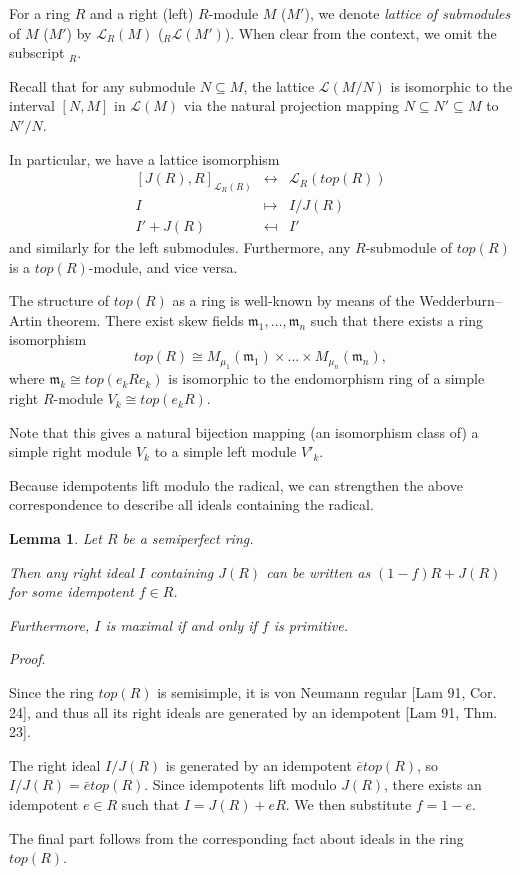 \documentclass[11pt]{article}
\theoremstyle{plain}
\newtheorem{Lemma}[veta]{Lemma}
\theoremstyle{remark}
\theoremstyle{plain}
\newenvironment{Proof}{
  \par\medskip\noindent
  \textit{Proof}.
}{
\newline
\rightline{$\qedsymbol$}
}
\newcommand{\m}{\mathfrak{m}}
\begin{document}
\smallskip 


For a ring $R$ and a right (left) $R$-module $M$ ($M'$), we denote \textit{lattice of submodules} of $M$ ($M'$) by $\mathcal{L}_R(M)$ ($_R\mathcal{L}(M')$). When clear from the context, we omit the subscript $_R$. 

Recall that for any submodule $N\subseteq M$, the lattice $\mathcal{L}(M/N)$ is isomorphic to the interval $[N,M]$ in ${\mathcal{L}(M)}$ via the natural projection  mapping $N\subseteq N'\subseteq M$ to $N'/N$.

In particular, we have a lattice isomorphism \[
\begin{array}{rcl}
    [J(R), R]_{\mathcal{L}_R(R)} & \longleftrightarrow & \mathcal{L}_R(top(R)) \\[1ex]
    I & \longmapsto & I/J(R) \\[1ex]
    I'+J(R) & \mapsfrom & I'
\end{array}
\]
and similarly for the left submodules. Furthermore, any $R$-submodule of $top(R)$ is a $top(R)$-module, and vice versa. 

The structure of $top(R)$ as a ring is well-known by means of the Wedderburn–Artin theorem. There exist skew fields $\m_1, \dots, \m_n$ such that there exists a ring isomorphism \[top(R)\cong M_{\mu_1}(\m_1)\times \dots \times  M_{\mu_n}(\m_n), \]
where $\m_k\cong top(e_kRe_k)$ is isomorphic to the endomorphism ring of a simple right $R$-module $V_k\cong top(e_kR)$.

Note that this gives a natural bijection mapping (an isomorphism class of) a simple right module $V_k$ to a simple left module $V'_k$.


\smallskip 

Because idempotents lift modulo the radical, we can strengthen the above correspondence to describe all ideals containing the radical.
\begin{Lemma}\label{LemmaIdealsAboveJ}
Let $R$ be a semiperfect ring.

Then any right ideal $I$ containing $J(R)$ can be written as $(1-f)R+J(R)$ for some idempotent $f\in R$.    

Furthermore, $I$ is maximal if and only if $f$ is primitive. 
\end{Lemma}
\begin{Proof}
Since the ring $top(R)$ is semisimple, it is von Neumann regular [Lam 91, Cor. 24], and thus all its right ideals are generated by an idempotent [Lam 91, Thm. 23].  

    The right ideal $I/J(R)$ is generated by an idempotent $\bar{e}top(R)$, so $I/J(R)=\bar{e}top(R)$. Since idempotents lift modulo $J(R)$, there exists an idempotent $e\in R$ such that $I=J(R)+eR$. We then substitute $f=1-e$.

The final part follows from the corresponding fact about ideals in the ring $top(R)$.   
\end{Proof}
\end{document}
